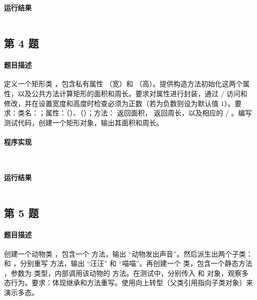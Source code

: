 \documentclass{academics}
\begin{document}
\paragraph{运行结果} {
    \inputminted{text}{../res/P03.out}
}

\subsection{第 4 题}

\paragraph{题目描述} {
    定义一个矩形类 ，包含私有属性 （宽）和 （高）。提供构造方法初始化这两个属性，以及公共方法计算矩形的面积和周长。要求对属性进行封装，通过  /  访问和修改，并在设置宽度和高度时检查必须为正数（若为负数则设为默认值 $1$）。要求：类名：；属性：（）、（）；方法： 返回面积， 返回周长，以及相应的  / 。编写测试代码，创建一个矩形对象，输出其面积和周长。
}

\paragraph{程序实现} {
    \inputminted[label=Rectangle.java]{java}{../src/P04/Rectangle.java}
    \inputminted[label=Main.java]{java}{../src/P04/Main.java}
}

\paragraph{运行结果} {
    \inputminted{text}{../res/P04.out}
}

\subsection{第 5 题}

\paragraph{题目描述} {
    创建一个动物类 ，包含一个  方法，输出 ``动物发出声音''。然后派生出两个子类： 和 ，分别重写  方法，输出 ``汪汪'' 和 ``喵喵''。再创建一个  类，包含一个静态方法 ，参数为  类型，内部调用该动物的  方法。在测试中，分别传入  和  对象，观察多态行为。要求：体现继承和方法重写。使用向上转型（父类引用指向子类对象）来演示多态。
}
\end{document}
